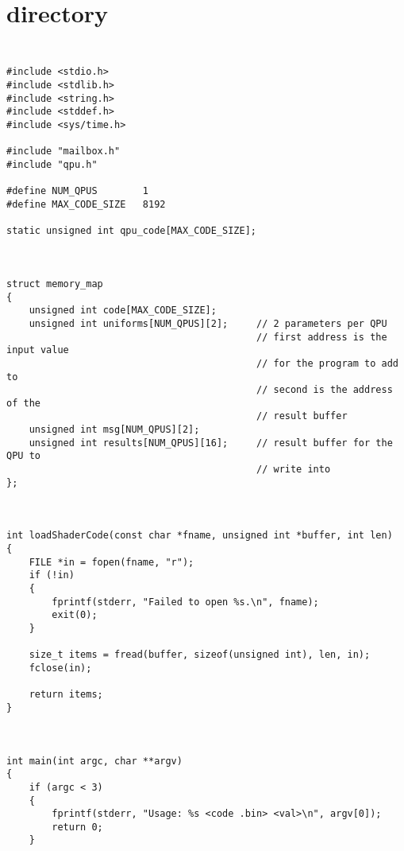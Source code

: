 
\chapter{ directory} %

\label{AppendixE} %

\section{} %


\begin{lstlisting}

#include <stdio.h>
#include <stdlib.h>
#include <string.h>
#include <stddef.h>
#include <sys/time.h>

#include "mailbox.h"
#include "qpu.h"

#define NUM_QPUS        1
#define MAX_CODE_SIZE   8192

static unsigned int qpu_code[MAX_CODE_SIZE];



struct memory_map
{
    unsigned int code[MAX_CODE_SIZE];
    unsigned int uniforms[NUM_QPUS][2];     // 2 parameters per QPU
                                            // first address is the input value
                                            // for the program to add to
                                            // second is the address of the
                                            // result buffer
    unsigned int msg[NUM_QPUS][2];
    unsigned int results[NUM_QPUS][16];     // result buffer for the QPU to
                                            // write into
};



int loadShaderCode(const char *fname, unsigned int *buffer, int len)
{
    FILE *in = fopen(fname, "r");
    if (!in)
    {
        fprintf(stderr, "Failed to open %s.\n", fname);
        exit(0);
    }

    size_t items = fread(buffer, sizeof(unsigned int), len, in);
    fclose(in);

    return items;
}



int main(int argc, char **argv)
{
    if (argc < 3)
    {
        fprintf(stderr, "Usage: %s <code .bin> <val>\n", argv[0]);
        return 0;
    }




\end{lstlisting}
